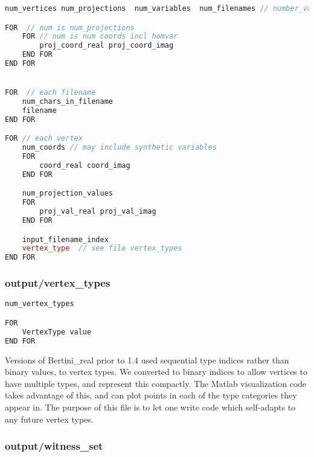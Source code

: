 \begin{center}\begin{minipage}{0.9\linewidth}
\begin{lstlisting}[language=c++, caption={\tt output/V.vertex}, captionpos=b]
num_vertices num_projections  num_variables  num_filenames // number_vars includes homvar

FOR  // num is num_projections
	FOR // num is num coords incl homvar
		proj_coord_real proj_coord_imag
	END FOR
END FOR


FOR  // each filename
	num_chars_in_filename
	filename
END FOR

FOR // each vertex
	num_coords // may include synthetic variables
	FOR
		coord_real coord_imag
	END FOR

	num_projection_values
	FOR
		proj_val_real proj_val_imag
	END FOR

	input_filename_index
	vertex_type  // see file vertex_types
END FOR
\end{lstlisting}
\end{minipage}\end{center}


\subsubsection{output/vertex\_types}
\label{sec:vertex_types}


\begin{center}\begin{minipage}{0.9\linewidth}
\begin{lstlisting}[language=c++, caption={\tt output/vertex\_types}, captionpos=b]
num_vertex_types

FOR
	VertexType value
END FOR
\end{lstlisting}
\end{minipage}\end{center}


Versions of Bertini\_real prior to 1.4
used sequential type indices rather than binary values, to vertex types.  We converted to binary indices to allow vertices to have multiple types, and represent this compactly.  The Matlab visualization code takes advantage of this, and can plot points in each of the type categories they appear in.  The purpose of this file is to let one write code which self-adapts to any future vertex types.







\subsubsection{output/witness\_set}
\label{sec:witness_set}


